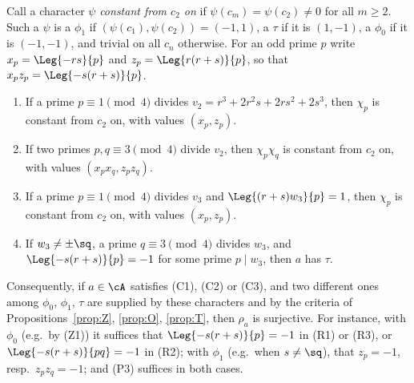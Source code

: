 \begin{corollary}
  \label{cor:further}
  \leanok
  Call a character $\psi$ \emph{constant from $c_2$ on} if $\psi(c_m) = \psi(c_2) \ne 0$ for all
  $m \ge 2$. Such a $\psi$ is a $\phi_1$ if $(\psi(c_1), \psi(c_2)) = (-1, 1)$, a $\tau$ if it is
  $(1, -1)$, a $\phi_0$ if it is $(-1, -1)$, and trivial on all $c_n$ otherwise. For an odd prime
  $p$ write $x_p = \Leg{-rs}{p}$ and $z_p = \Leg{r(r+s)}{p}$, so that $x_p z_p = \Leg{-s(r+s)}{p}$.
  \begin{enumerate}
    \item[(R1)] If a prime $p \equiv 1 \pmod 4$ divides $v_2 = r^3 + 2r^2 s + 2rs^2 + 2s^3$, then
          $\chi_p$ is constant from $c_2$ on, with values $(x_p, z_p)$.
    \item[(R2)] If two primes $p, q \equiv 3 \pmod 4$ divide $v_2$, then $\chi_p \chi_q$ is
          constant from $c_2$ on, with values $(x_p x_q, z_p z_q)$.
    \item[(R3)] If a prime $p \equiv 1 \pmod 4$ divides $v_3$ and $\Leg{(r + s) w_3}{p} = 1$, then
          $\chi_p$ is constant from $c_2$ on, with values $(x_p, z_p)$.
    \item[(P3)] If $w_3 \ne \pm\sq$, a prime $q \equiv 3 \pmod 4$ divides $w_3$, and
          $\Leg{-s(r+s)}{p} = -1$ for some prime $p \mid w_3$, then $a$ has $\tau$.
  \end{enumerate}
  Consequently, if $a \in \cA$ satisfies (C1), (C2) or (C3), and two different ones among
  $\phi_0$, $\phi_1$, $\tau$ are supplied by these characters and by the criteria of
  Propositions~\ref{prop:Z}, \ref{prop:O}, \ref{prop:T}, then $\rho_a$ is surjective. For
  instance, with $\phi_0$ (e.g.\ by (Z1)) it suffices that $\Leg{-s(r+s)}{p} = -1$ in (R1) or
  (R3), or $\Leg{-s(r+s)}{pq} = -1$ in (R2); with $\phi_1$ (e.g.\ when $s \ne \sq$), that
  $z_p = -1$, resp.\ $z_p z_q = -1$; and (P3) suffices in both cases.
\end{corollary}
